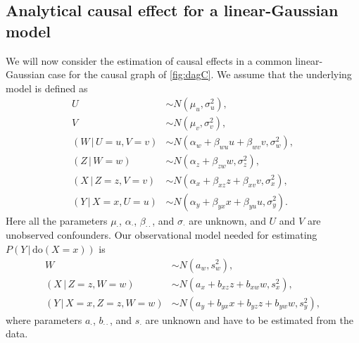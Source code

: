 \documentclass[11pt,a4paper,twoside]{article}
\newcommand{\+}[1]{\ensuremath{\mathbf{#1}}}
\newcommand{\doo}{\textrm{do}}
\newcommand{\given}{{ \, | \, }}
\begin{document}
	\subsection{Analytical causal effect for a linear-Gaussian model}
	\label{sec:linear_gaussian_analytical}
	We will now consider the estimation of causal effects in a common linear-Gaussian case for the causal graph of \autoref{fig:dagC}. We assume that the underlying model is defined as
	\begin{equation} 
	\label{eq:dgm}
	\begin{aligned}
	U &\sim N(\mu_{u}, \sigma_{u}^2),\\
	V &\sim N(\mu_{v}, \sigma_{v}^2),\\
	(W \given U = u, V = v) &\sim N(\alpha_{w} + \beta_{wu}u + \beta_{wv}v, \sigma_w^2),\\
	(Z \given W = w) &\sim N(\alpha_z + \beta_{zw} w, \sigma_z^2),\\
	(X \given Z = z, V = v) &\sim N(\alpha_x + \beta_{xz} z + \beta_{xv} v, \sigma_x^2),\\
	(Y \given X = x, U = u) &\sim N(\alpha_y + \beta_{yx} x + \beta_{yu} u, \sigma_y^2).
	\end{aligned}
	\end{equation}
	Here all the parameters $\mu_{\cdot}$, $\alpha_{\cdot}$, $\beta_{\cdot\cdot}$, and $\sigma_{\cdot}$ are unknown, and $U$ and $V$ are unobserved confounders. Our observational model needed for estimating $P(Y \given \doo(X = x))$ is
	\begin{equation} 
	\label{eq:cm}
	\begin{aligned}
	W &\sim N(a_{w}, s_w^2),\\
	(X \given Z = z, W = w)&\sim N(a_x + b_{xz} z + b_{xw} w, s_x^2),\\
	(Y \given X = x, Z = z, W = w) &\sim N(a_y + b_{yx} x + b_{yz} z + b_{yw} w, s_y^2),
	\end{aligned}
	\end{equation}
	where parameters $a_{\cdot}$, $b_{\cdot\cdot}$, and $s_{\cdot}$ are unknown and have to be estimated from the data.
	
\end{document}
